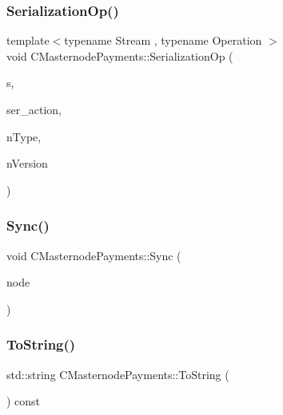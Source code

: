 \subsubsection{\texorpdfstring{Serialization\+Op()}{SerializationOp()}}
{\footnotesize\ttfamily template$<$typename Stream , typename Operation $>$ \\
void C\+Masternode\+Payments\+::\+Serialization\+Op (\begin{DoxyParamCaption}\item[{Stream \&}]{s,  }\item[{Operation}]{ser\+\_\+action,  }\item[{int}]{n\+Type,  }\item[{int}]{n\+Version }\end{DoxyParamCaption})\hspace{0.3cm}{\ttfamily [inline]}}

\mbox{\label{class_c_masternode_payments_adb635a5a7682a19cf235be300cd88680}} 
\subsubsection{\texorpdfstring{Sync()}{Sync()}}
{\footnotesize\ttfamily void C\+Masternode\+Payments\+::\+Sync (\begin{DoxyParamCaption}\item[{\mbox{\hyperlink{class_c_node}{C\+Node}} $\ast$}]{node }\end{DoxyParamCaption})}

\mbox{\label{class_c_masternode_payments_ac020d2b42771a003a271d4ddb014272a}} 
\subsubsection{\texorpdfstring{To\+String()}{ToString()}}
{\footnotesize\ttfamily std\+::string C\+Masternode\+Payments\+::\+To\+String (\begin{DoxyParamCaption}{ }\end{DoxyParamCaption}) const}

\mbox{\label{class_c_masternode_payments_a553956af74bd1b03c7090b98841d61fb}} 
